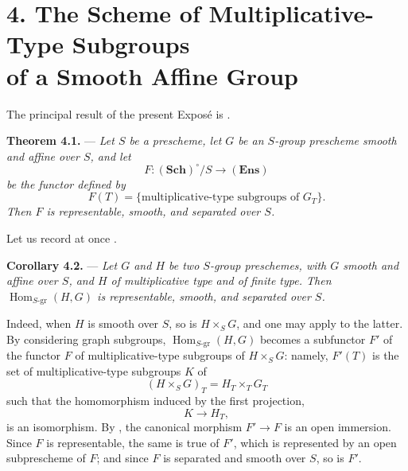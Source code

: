
\section*{4. The Scheme of Multiplicative-Type Subgroups\\
of a Smooth Affine Group}

The principal result of the present Exposé is .

\medskip
\noindent{}\textbf{Theorem 4.1.} ---
\textit{Let \(S\) be a prescheme, let \(G\) be an \(S\)-group
prescheme smooth and affine over \(S\), and let}
\[
  F\colon(\mathbf{Sch})^\circ/S\longrightarrow(\mathbf{Ens})
\]
\textit{be the functor defined by}
\[
  F(T)=\{\text{multiplicative-type subgroups of \(G_T\)}\}.
\]
\textit{Then \(F\) is representable, smooth, and separated over
\(S\).}

Let us record at once .

\medskip
\noindent{}\textbf{Corollary 4.2.} ---
\textit{Let \(G\) and \(H\) be two \(S\)-group preschemes, with
\(G\) smooth and affine over \(S\), and \(H\) of multiplicative type
and of finite type.  Then
\(\operatorname{Hom}_{S\text{-}\mathrm{gr}}(H,G)\) is representable,
smooth, and separated over \(S\).}

Indeed, when \(H\) is smooth over \(S\), so is \(H\times_S G\), and
one may apply  to the latter.
By considering graph subgroups,
\(\operatorname{Hom}_{S\text{-}\mathrm{gr}}(H,G)\) becomes a
subfunctor \(F'\) of the functor \(F\) of multiplicative-type
subgroups of \(H\times_S G\): namely, \(F'(T)\) is the set of
multiplicative-type subgroups \(K\) of
\[
  (H\times_S G)_T=H_T\times_TG_T
\]
such that the homomorphism induced by the first projection,
\[
  K\longrightarrow H_T,
\]
is an isomorphism.  By , the canonical morphism
\(F'\to F\) is an open immersion.  Since \(F\) is representable,
the same is true of \(F'\), which is represented by an open
subprescheme of \(F\); and since \(F\) is separated and smooth over
\(S\), so is \(F'\).


